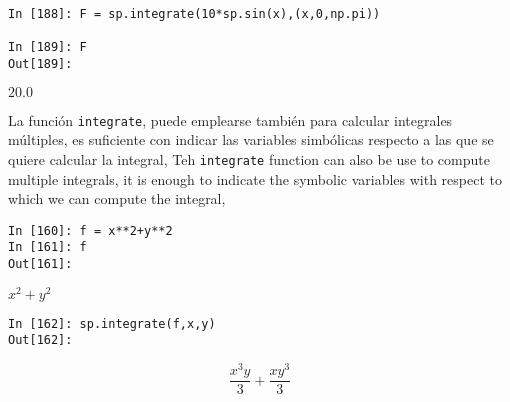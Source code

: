 \begin{center}
	\begin{minipage}{.5\textwidth}
	\begin{verbatim}
In [188]: F = sp.integrate(10*sp.sin(x),(x,0,np.pi))

In [189]: F
Out[189]:   
		\end{verbatim}
		$20.0$
	\end{minipage}
\end{center}
\begin{paracol}{2}
	La función \texttt{integrate}, puede emplearse también para calcular integrales múltiples, es suficiente con indicar las variables simbólicas respecto a las que se quiere calcular la integral,
	\switchcolumn
	Teh \texttt{integrate} function can also be use to compute multiple integrals, it is enough to indicate the symbolic variables with respect to which we can compute the integral,
\end{paracol}

\begin{center}
	\begin{minipage}{.5\textwidth}
		\begin{verbatim}
In [160]: f = x**2+y**2
In [161]: f
Out[161]: 
		\end{verbatim}
		$x^2+y^2$
		\begin{verbatim}
In [162]: sp.integrate(f,x,y)
Out[162]: 
		\end{verbatim}
		\begin{equation*}
			\frac{x^3y}{3}+\frac{xy^3}{3}
		\end{equation*}
	\end{minipage}
\end{center}

